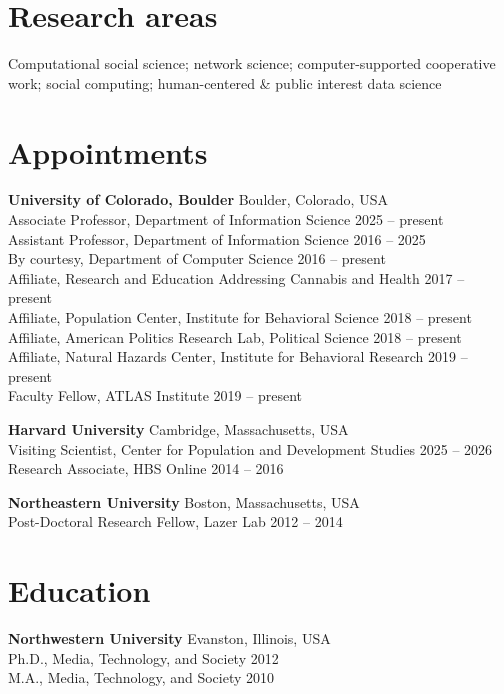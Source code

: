\documentclass{cv}
\begin{document}
\makeheader

	\section{Research areas}
	Computational social science; network science; computer-supported cooperative work; social computing; human-centered \& public interest data science

	\section{Appointments}
	\textbf{University of Colorado, Boulder} \hfill Boulder, Colorado, USA \\
	Associate Professor, Department of Information Science \hfill 2025 -- present\\
	Assistant Professor, Department of Information Science \hfill 2016 -- 2025\\
	By courtesy, Department of Computer Science \hfill 2016 -- present \\
	Affiliate, Research and Education Addressing Cannabis and Health \hfill 2017 -- present \\
	Affiliate, Population Center, Institute for Behavioral Science \hfill 2018 -- present \\
	Affiliate, American Politics Research Lab, Political Science \hfill 2018 -- present \\
	Affiliate, Natural Hazards Center, Institute for Behavioral Research \hfill 2019 -- present \\
	Faculty Fellow, ATLAS Institute \hfill 2019 -- present

	\textbf{Harvard University} \hfill Cambridge, Massachusetts, USA \\
	Visiting Scientist, Center for Population and Development Studies \hfill 2025 -- 2026 \\
	Research Associate, HBS Online \hfill 2014 -- 2016

	\textbf{Northeastern University} \hfill Boston, Massachusetts, USA \\
	Post-Doctoral Research Fellow, Lazer Lab \hfill 2012 -- 2014

	\section{Education}
	\textbf{Northwestern University} \hfill Evanston, Illinois, USA \\
	Ph.D., Media, Technology, and Society \hfill 2012 \\
	M.A., Media, Technology, and Society \hfill 2010
\end{document}
